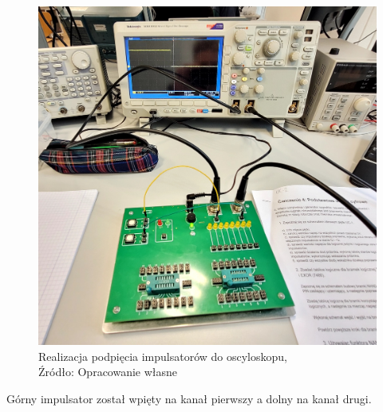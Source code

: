 \documentclass{article}
\begin{document}
      \begin{figure}[!ht]
        \centering
        \includegraphics[scale=0.15]{grafiki/impulsatory.png}
        \caption{Realizacja podpięcia impulsatorów do oscyloskopu,
        \\Źródło: Opracowanie własne}
      \end{figure}
       Górny impulsator został wpięty na kanał pierwszy a dolny na kanał drugi.
\end{document}
